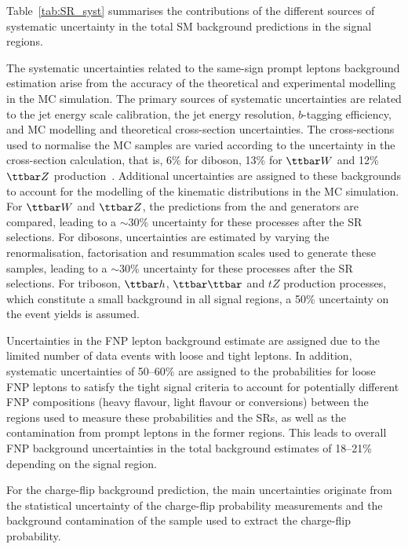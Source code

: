 Table~\ref{tab:SR_syst} summarises the contributions of the different sources of systematic uncertainty 
in the total SM background predictions in the signal regions.

The systematic uncertainties related to the same-sign prompt leptons background estimation 
arise from the accuracy of the theoretical and experimental modelling in the MC simulation.
The primary sources of systematic uncertainties are related to
the jet energy scale calibration, 
the jet energy resolution, 
$b$-tagging efficiency, 
and MC modelling and theoretical cross-section uncertainties. 
The cross-sections used to normalise the MC samples are varied according to the uncertainty in the 
cross-section calculation, that is, 6\% for diboson, 13\% for $\ttbar W$ and 12\% $\ttbar Z$ production~\cite{Alwall:2014hca}.
Additional uncertainties are assigned to these backgrounds 
to account for the modelling of the kinematic distributions in the MC simulation. 
For $\ttbar W$ and $\ttbar Z$, the predictions from the \MADGRAPH and \SHERPA generators are compared, 
leading to a $\sim$30\% uncertainty for these processes after the SR selections. 
For dibosons, uncertainties are estimated by varying the renormalisation, factorisation and resummation scales used to generate these samples, 
leading to a $\sim$30\% uncertainty for these processes after the SR selections. 
For triboson, $\ttbar h$, $\ttbar \ttbar$ and $tZ$ production processes, which constitute a small background in all signal regions, a 50\% uncertainty on the event yields is assumed.

Uncertainties in the FNP lepton background estimate are assigned due to the limited number of data events with loose and tight leptons.
In addition, systematic uncertainties of 50--60\% are assigned to the probabilities for loose FNP leptons to satisfy the tight signal criteria to account for potentially different FNP compositions (heavy flavour, light flavour or conversions) between the regions used to measure these probabilities and the SRs, as well as the contamination from prompt leptons in the former regions.
This leads to overall FNP background uncertainties in the total background estimates of 18--21\% depending on the signal region.

For the charge-flip background prediction, the main uncertainties originate from the statistical 
uncertainty of the charge-flip probability measurements and the background contamination of the 
sample used to extract the charge-flip probability. 

